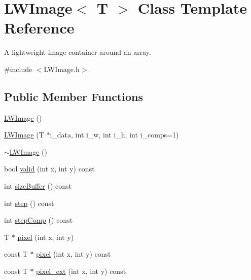 \hypertarget{classLWImage}{}\section{L\+W\+Image$<$ T $>$ Class Template Reference}
\label{classLWImage}


A lightweight image container around an array.  




{\ttfamily \#include $<$L\+W\+Image.\+h$>$}

\subsection*{Public Member Functions}
\begin{DoxyCompactItemize}
\item 
\hyperlink{classLWImage_acc5cb4d5cb85504d6b40c68dfdd3bec5}{L\+W\+Image} ()
\item 
\hyperlink{classLWImage_a17e360b58f83aa10181b0e6500cc96c3}{L\+W\+Image} (T $\ast$i\+\_\+data, int i\+\_\+w, int i\+\_\+h, int i\+\_\+comps=1)
\item 
\hyperlink{classLWImage_a31d0a5b47939932579579e70eef89d3f}{$\sim$\+L\+W\+Image} ()
\item 
bool \hyperlink{classLWImage_a38114f083eb9ee8e0c0ddf13f5486275}{valid} (int x, int y) const 
\item 
int \hyperlink{classLWImage_a58eaac30f7f995fc1f2a09d7356a3563}{size\+Buffer} () const 
\item 
int \hyperlink{classLWImage_a6ec118ecc5d0b3a2d9885e209d57353c}{step} () const 
\item 
int \hyperlink{classLWImage_af7b6521358c87f120dd3704701e17980}{step\+Comp} () const 
\item 
T $\ast$ \hyperlink{classLWImage_aad51f572a29b84e286df400fc4cc8c12}{pixel} (int x, int y)
\item 
const T $\ast$ \hyperlink{classLWImage_ad7369bc1432ca019ed710878cc99c3cf}{pixel} (int x, int y) const 
\item 
const T $\ast$ \hyperlink{classLWImage_accb41f1e71059c84267eb88f010c5469}{pixel\+\_\+ext} (int x, int y) const 
\end{DoxyCompactItemize}
